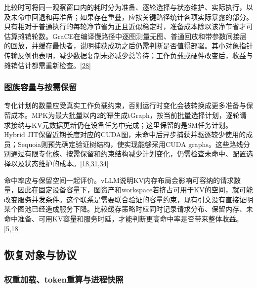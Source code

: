 \documentclass[
  UTF8,
  zihao=5]{ctexart}
\begin{document}
比较时可将同一观察窗口内的耗时分为准备、逐轮选择与状态维护、实际执行，以及未命中回退和再准备；如果存在重叠，应按关键路径统计各项实际暴露的部分。只有相对于普通执行的每轮净节省为正且近似稳定时，准备成本除以该净节省才可估算摊销轮数。GraCE在编译慢路径中逐图测量无图、普通回放和带参数间接层的回放，并缓存最快者，说明捕获成功之后仍需判断是否值得部署。其小对象指针传输反例也表明，减少数据复制未必减少总等待；工作负载或硬件改变后，收益与摊销估计都需重新检查。{[}\protect\hyperlink{ref-ghosh2026grace}{28}{]}

\hypertarget{ux56feux65cfux5bb9ux91cfux4e0eux6309ux9700ux4fddux7559}{%
\subsubsection{图族容量与按需保留}\label{ux56feux65cfux5bb9ux91cfux4e0eux6309ux9700ux4fddux7559}}

专化计划的数量应受真实工作负载约束，否则运行时变化会被转换成更多准备与保留成本。MPK为最大批量以内2的幂生成tGraph，按当前批量选择计划，逐轮请求接纳与KV元数据更新仍在设备任务中完成；这里保留的是SM任务计划。Hybrid
JIT保留近期长度对应的CUDA图，未命中后异步捕获并驱逐较少使用的成员；Sequoia则预先确定验证树结构，使实现能够采用CUDA
graphs。这些路线分别通过有限专化族、按需保留和约束结构减少计划变化，仍需检查未命中、配置选择以及状态维护的成本。{[}\protect\hyperlink{ref-yadav2026hybridpreprint}{18},\protect\hyperlink{ref-cheng2026mpk}{31},\protect\hyperlink{ref-chen2024sequoia}{34}{]}

命中率应与保留空间一起评价。vLLM说明KV内存布局会影响可容纳的请求数量，因此在固定设备容量下，图资产和workspace若挤占可用于KV的空间，就可能改变服务并发条件。这个联系是需要联合验证的容量约束，现有引文没有直接证明某个图池已经造成服务下降。比较缓存策略时应同时记录请求分布、保留内存、未命中准备、可用KV容量和服务时延，才能判断更高命中率是否带来整体收益。{[}\protect\hyperlink{ref-kwon2023vllm}{5},\protect\hyperlink{ref-yadav2026hybridpreprint}{18}{]}

\hypertarget{ux6062ux590dux5bf9ux8c61ux4e0eux534fux8bae}{%
\subsection{恢复对象与协议}\label{ux6062ux590dux5bf9ux8c61ux4e0eux534fux8bae}}

\hypertarget{ux6743ux91cdux52a0ux8f7dtokenux91cdux7b97ux4e0eux8fdbux7a0bux5febux7167}{%
\subsubsection{权重加载、token重算与进程快照}\label{ux6743ux91cdux52a0ux8f7dtokenux91cdux7b97ux4e0eux8fdbux7a0bux5febux7167}}
\end{document}
